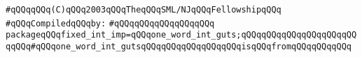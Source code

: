 \label{src/lib/std/src/bind-fixedint-32.pkg}
\verb|#qQQqqQQq(C)qQQq2003qQQqTheqQQqSML/NJqQQqFellowshipqQQq|\newline
\newline
\verb|#qQQqCompiledqQQqby:|\newline
\verb|#qQQqqQQqqQQqqQQqqQQq|\newline
\newline
\verb|packageqQQqfixed_int_imp=qQQqone_word_int_guts;qQQqqQQqqQQqqQQqqQQqqQQqqQQq#qQQqone_word_int_gutsqQQqqQQqqQQqqQQqqQQqisqQQqfromqQQqqQQqqQQq|\newline

